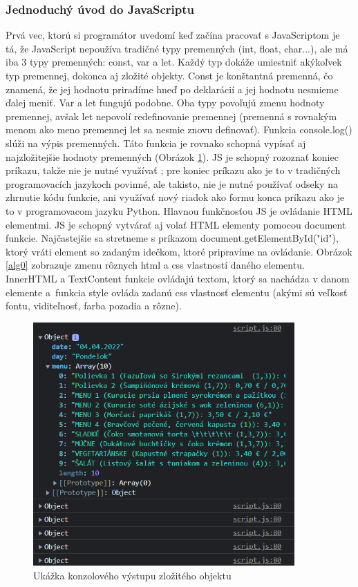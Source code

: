 \subsubsection{Jednoduchý úvod do JavaScriptu}
Prvá vec, ktorú si programátor uvedomí keď začína pracovať s JavaScriptom je tá, že JavaScript nepoužíva tradičné typy premenných (int, float, char...), ale má iba 3 typy premenných: const, var a let. Každý typ dokáže umiestniť akýkoľvek  typ premennej, dokonca aj zložité objekty. Const je konštantná premenná, čo znamená, že jej hodnotu priradíme hneď po deklarácií  a jej hodnotu nesmieme ďalej meniť. Var a let fungujú podobne. Oba typy povoľujú zmenu hodnoty premennej, avšak let nepovolí redefinovanie premennej (premenná s rovnakým menom ako meno premennej let sa nesmie znovu definovať). Funkcia console.log() slúži na výpis premenných. Táto funkcia je rovnako schopná vypísať aj najzložitejšie hodnoty premenných (Obrázok \ref{Log}). JS je schopný rozoznať koniec príkazu, takže nie je nutné využívať ; pre koniec príkazu ako je to v tradičných programovacích jazykoch povinné, ale takisto, nie je nutné používať odseky na zhrnutie kódu  funkcie, ani využívať nový riadok ako formu konca príkazu ako je to v programovacom jazyku Python. Hlavnou funkčnosťou JS je ovládanie HTML elementmi. JS je schopný vytvárať aj volať HTML elementy pomocou document funkcie. Najčastejšie sa stretneme s príkazom document.getElementById("id"), ktorý vráti element so zadaným idečkom, ktoré pripravíme na ovládanie. Obrázok \ref{alg0} zobrazuje zmenu rôznych html a css vlastností daného elementu. InnerHTML a TextContent funkcie ovládajú textom, ktorý sa nachádza v danom elemente a funkcia  style ovláda zadanú css vlastnosť elementu (akými sú veľkosť fontu, viditeľnosť, farba pozadia a rôzne).

\begin{figure}[!htbp]
    \centering
    \includegraphics[width=10cm]{img/y.PNG}
    \caption{Ukážka konzolového výstupu zložitého objektu}
    \label{Log}
\end{figure}

